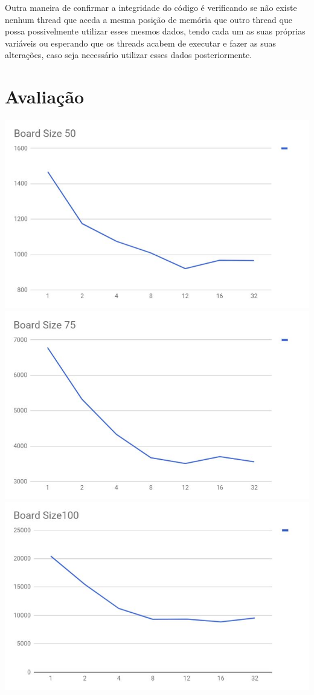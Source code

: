 \documentclass[a4paper]{article}
\begin{document}
Outra maneira de confirmar a integridade do código é verificando se não existe nenhum thread que aceda a mesma posição de memória que outro thread que possa possivelmente utilizar esses mesmos dados, tendo cada um as suas próprias variáveis ou esperando que os threads acabem de executar e fazer as suas alterações, caso seja necessário utilizar esses dados posteriormente.

\section{Avaliação}
\includegraphics{bs50.JPG}
\includegraphics{bs75.JPG}
\includegraphics{bs100.JPG}
\end{document}
